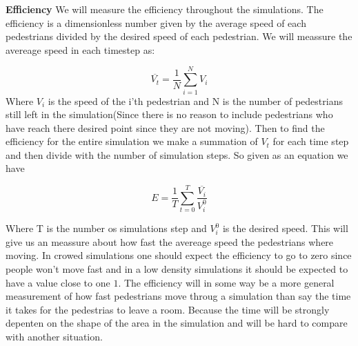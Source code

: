\textbf{Efficiency}
We will measure the efficiency throughout the simulations. The efficiency is a 
dimensionless number given by the average speed of each pedestrians divided by 
the desired speed of each pedestrian. We will meassure the avereage speed in each 
timestep as:

\begin{equation}
	\overline{V_t}=\frac{1}{N}\sum_{i=1}^{N}V_i
\end{equation}
Where $V_i$ is the speed of the i'th pedestrian and N is the number of pedestrians 
still left in the simulation(Since there is no reason to include pedestrians who have 
reach there desired point since they are not moving). Then to find the efficiency for 
the entire simulation we make a summation of $V_t$ for each time step and then divide 
with the number of simulation steps. So given as an equation we have

\begin{equation}
		E=\frac{1}{T}\sum_{t=0}^{T}\frac{\overline{V_i}}{V^0_{i}}
\end{equation}

Where T is the number os simulations step and $V^0_{i}$ is the desired speed. This will 
give us an meassure about how fast the avereage speed the pedestrians where moving. In 
crowed simulations one should expect the efficiency to go to zero since people won't move 
fast and in a low density simulations it should be expected to have a value close to one $1$. 
The efficiency will in some way be a more general measurement of how fast pedestrians move 
throug a simulation than say the time it takes for the pedestrias to leave a room. Because 
the time will be strongly depenten on the shape of the area in the simulation and will be 
hard to compare with another situation. 
	
